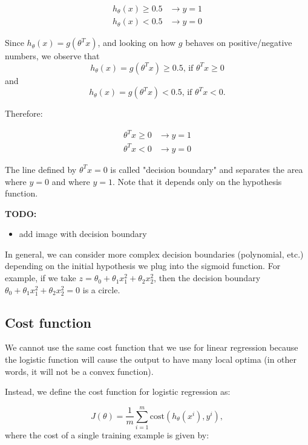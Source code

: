 \documentclass[a4paper,11pt]{report}
\newcommand{\cost}{\mathrm{cost}}
\begin{document}
\begin{align*}
  h_\theta(x) \geq 0.5 & \longrightarrow y =1 \\
  h_\theta(x) < 0.5 & \longrightarrow y = 0
\end{align*}

Since $h_\theta(x) = g(\theta^Tx)$, and looking on how $g$ behaves on positive/negative numbers, we observe that $$h_\theta(x) = g(\theta^T x) \geq 0.5  \text{, if } \theta^T x \geq 0$$ and $$h_\theta(x) = g(\theta^T x) < 0.5  \text{, if } \theta^T x < 0.$$

Therefore:

\begin{align*}
  \theta^Tx \geq 0 & \longrightarrow y =1 \\
  \theta^Tx < 0 & \longrightarrow y = 0
\end{align*}

The line defined by $\theta^Tx = 0$ is called "decision boundary" and separates the area where $y = 0$ and where $y = 1$. Note that it depends only on the hypothesis function.

\textbf{TODO:}
\begin{itemize}
  \item add image with decision boundary
\end{itemize}

In general, we can consider more complex decision boundaries (polynomial, etc.) depending on the initial hypothesis we plug into the sigmoid function. For example, if we take \break
$z = \theta_0 + \theta_1x_1^2 +\theta_2x_2^2$, then the decision boundary $\theta_0 + \theta_1x_1^2 +\theta_2x_2^2 = 0$ is a circle.

\subsection*{Cost function}

 We cannot use the same cost function that we use for linear regression because the logistic function will cause the output to have many local optima (in other words, it will not be a convex function).

Instead, we define the cost function for logistic regression as:

\begin{equation}\label{eq:log-reg-cost}
J(\theta) = \dfrac{1}{m} \sum_{i=1}^{m}{\cost(h_\theta(x^i), y^i)},
\end{equation}
where the cost of a single training example is given by:
\end{document}
